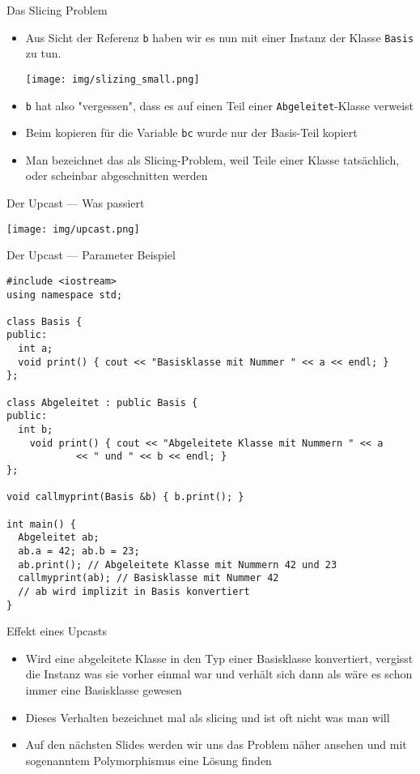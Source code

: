 \documentclass[presentation]{beamer}
\begin{document}
\begin{frame}[label={sec:org15afb5d},fragile]{Das Slicing Problem}
 \begin{itemize}
\item Aus Sicht der Referenz {\color{solarizedYellow}\verb!b!} haben wir es nun mit einer Instanz der
Klasse {\color{solarizedYellow}\verb!Basis!} zu tun.

\begin{center}
\texttt{[image: img/slizing\_small.png]}
\end{center}
\item {\color{solarizedYellow}\verb!b!} hat also "vergessen", dass es auf einen Teil einer
{\color{solarizedYellow}\verb!Abgeleitet!}-Klasse verweist
\item Beim kopieren für die Variable {\color{solarizedYellow}\verb!bc!} wurde nur der Basis-Teil kopiert
\item Man bezeichnet das als Slicing-Problem, weil Teile einer Klasse
tatsächlich, oder scheinbar abgeschnitten werden
\end{itemize}
\end{frame}
\begin{frame}[label={sec:org8b603eb}]{Der Upcast --- Was passiert}
\begin{center}
\texttt{[image: img/upcast.png]}
\end{center}
\end{frame}
\begin{frame}[label={sec:org0d2e6e5},fragile]{Der Upcast --- Parameter Beispiel}
 \begin{verbatim}
#include <iostream>
using namespace std;

class Basis {
public:
  int a;
  void print() { cout << "Basisklasse mit Nummer " << a << endl; }
};

class Abgeleitet : public Basis {
public:
  int b;
    void print() { cout << "Abgeleitete Klasse mit Nummern " << a
			<< " und " << b << endl; }
};

void callmyprint(Basis &b) { b.print(); }

int main() {
  Abgeleitet ab;
  ab.a = 42; ab.b = 23;
  ab.print(); // Abgeleitete Klasse mit Nummern 42 und 23
  callmyprint(ab); // Basisklasse mit Nummer 42
  // ab wird implizit in Basis konvertiert
}
\end{verbatim}
\end{frame}
\begin{frame}[label={sec:orgef210a4}]{Effekt eines Upcasts}
\begin{itemize}
\item Wird eine abgeleitete Klasse in den Typ einer Basisklasse
konvertiert, vergisst die Instanz was sie vorher einmal war und
verhält sich dann als wäre es schon immer eine Basisklasse gewesen
\item Dieses Verhalten bezeichnet mal als \alert{slicing} und ist oft nicht was
man will
\item Auf den nächsten Slides werden wir uns das Problem näher ansehen und
mit sogenanntem \alert{Polymorphismus} eine Lösung finden
\end{itemize}
\end{frame}
\end{document}
